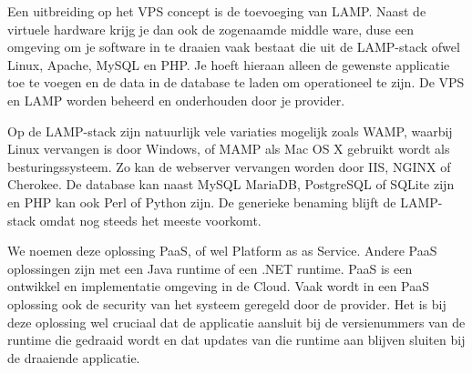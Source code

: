 Een uitbreiding op het VPS concept is de toevoeging van LAMP. Naast de virtuele hardware krijg je dan ook de zogenaamde middle ware, duse een omgeving om je software in te draaien vaak bestaat die uit de LAMP-stack ofwel Linux, Apache, MySQL en PHP. Je hoeft hieraan alleen de gewenste applicatie toe te voegen en de data in de database te laden om operationeel te zijn. De VPS en LAMP worden beheerd en onderhouden door je provider.

Op de LAMP-stack zijn natuurlijk vele variaties mogelijk zoals WAMP, waarbij Linux vervangen is door Windows, of MAMP als Mac OS X gebruikt wordt als besturingssysteem. Zo kan de webserver vervangen worden door IIS, NGINX of Cherokee. De database kan naast MySQL MariaDB, PostgreSQL of SQLite zijn en PHP kan ook Perl of Python zijn. De generieke benaming blijft de LAMP-stack omdat nog steeds het meeste voorkomt.

We noemen deze oplossing PaaS, of wel Platform as as Service. Andere PaaS oplossingen zijn met een Java runtime of een .NET runtime. PaaS is een ontwikkel en implementatie omgeving in de Cloud. Vaak wordt in een PaaS oplossing ook de security van het systeem geregeld door de provider. Het is bij deze oplossing wel cruciaal dat de applicatie aansluit bij de versienummers van de runtime die gedraaid wordt en dat updates van die runtime aan blijven sluiten bij de draaiende applicatie.
